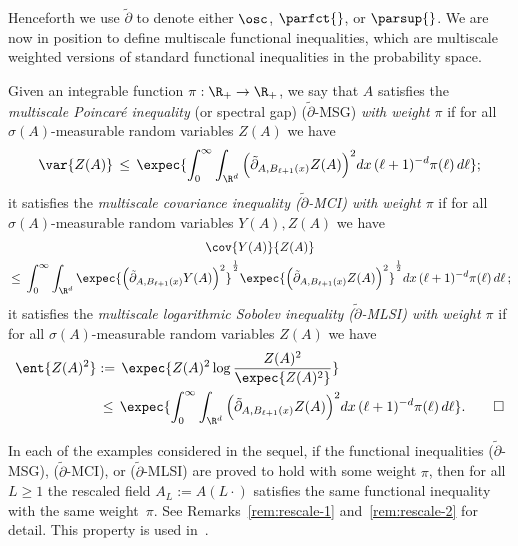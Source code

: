 Henceforth we use $\tilde\partial$ to denote either $\osc$, $\parfct{}$, or $\parsup{}$. We are now in position to define multiscale functional inequalities, which are multiscale weighted versions of standard functional inequalities in the probability space.
\begin{defi}\label{defi:TFI}
Given an integrable function $\pi:\R_+\to\R_+$, we say that $A$ satisfies the \emph{multiscale Poincaré inequality} (or spectral gap) ($\tilde \partial$-MSG) \emph{with weight $\pi$} if for all $\sigma(A)$-measurable random variables $Z(A)$ we have
\begin{align*}
\var{Z(A)}\,\le \,\expec{\int_0^\infty \int_{\R^d}\Big(\tilde\partial_{A,B_{\ell+1}(x)}Z(A)\Big)^{2}dx\,(\ell+1)^{-d}\pi(\ell)\,d\ell};
\end{align*}
it satisfies the \emph{multiscale covariance inequality \emph{($\tilde\partial$-MCI)} with weight $\pi$} if for all $\sigma(A)$-measurable random variables $Y(A),Z(A)$ we have
\begin{multline*}
\cov{Y(A)}{Z(A)}\\
\,\le\, \int_0^\infty \int_{\R^d}\expec{\Big(\tilde\partial_{A,B_{\ell+1}(x)}Y(A)\Big)^2}^{\frac12}\expec{\Big(\tilde\partial_{A,B_{\ell+1}(x)}Z(A)\Big)^2}^{\frac12}dx \,(\ell+1)^{-d}\pi(\ell)\,d\ell\,;
\end{multline*}
it satisfies the \emph{multiscale logarithmic Sobolev inequality \emph{($\tilde\partial$-MLSI)} with weight $\pi$} if for all $\sigma(A)$-measurable random variables $Z(A)$ we have
\begin{align*}
\ent{Z(A)^2}&:=\,\expec{Z(A)^2\log\frac{Z(A)^2}{\expec{Z(A)^2}}}\\
&\,\le\,\expec{\int_0^\infty \int_{\R^d}\Big(\tilde\partial_{A,B_{\ell+1}(x)}Z(A)\Big)^{2}dx\,(\ell+1)^{-d}\pi(\ell)\,d\ell}.\qedhere
\end{align*}
\end{defi}

\begin{rema}\label{rem:proofplus}
In each of the examples considered in the sequel, if the functional inequalities ($\tilde\partial$-MSG), ($\tilde\partial$-MCI), or ($\tilde\partial$-MLSI) are proved to hold with some weight $\pi$, then for all $L\ge1$ the rescaled field $A_L:=A(L\cdot)$ satisfies the same functional inequality with the same weight~$\pi$. See Remarks~\ref{rem:rescale-1} and~\ref{rem:rescale-2} for detail. This property is used in~\cite{GNO-reg}.
\end{rema}

